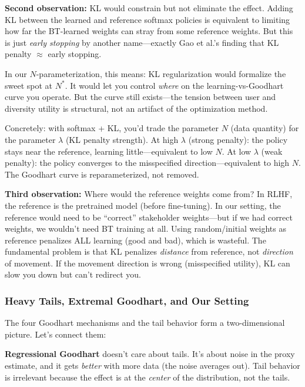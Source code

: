 \documentclass[11pt]{article}
\begin{document}
\textbf{Second observation:} KL would constrain but not eliminate the
effect. Adding KL between the learned and reference softmax policies is
equivalent to limiting how far the BT-learned weights can stray from
some reference weights. But this is just \emph{early stopping} by
another name---exactly Gao et al.'s finding that KL penalty
$\approx$ early stopping.

In our $N$-parameterization, this means: KL regularization would
formalize the sweet spot at $N^*$. It would let you control \emph{where}
on the learning-vs-Goodhart curve you operate. But the curve still
exists---the tension between user and diversity utility is structural,
not an artifact of the optimization method.

Concretely: with softmax + KL, you'd trade the parameter $N$ (data
quantity) for the parameter $\lambda$ (KL penalty strength). At high
$\lambda$ (strong penalty): the policy stays near the reference,
learning little---equivalent to low $N$. At low $\lambda$ (weak
penalty): the policy converges to the misspecified direction---equivalent
to high $N$. The Goodhart curve is reparameterized, not removed.

\textbf{Third observation:} Where would the reference weights come from?
In RLHF, the reference is the pretrained model (before fine-tuning).
In our setting, the reference would need to be ``correct'' stakeholder
weights---but if we had correct weights, we wouldn't need BT training at
all. Using random/initial weights as reference penalizes ALL learning
(good and bad), which is wasteful. The fundamental problem is that KL
penalizes \emph{distance} from reference, not \emph{direction} of
movement. If the movement direction is wrong (misspecified utility),
KL can slow you down but can't redirect you.

\subsubsection*{Heavy Tails, Extremal Goodhart, and Our Setting}

The four Goodhart mechanisms and the tail behavior form a
two-dimensional picture. Let's connect them:

\textbf{Regressional Goodhart} doesn't care about tails. It's about
noise in the proxy estimate, and it gets \emph{better} with more data
(the noise averages out). Tail behavior is irrelevant because the effect
is at the \emph{center} of the distribution, not the tails.
\end{document}
